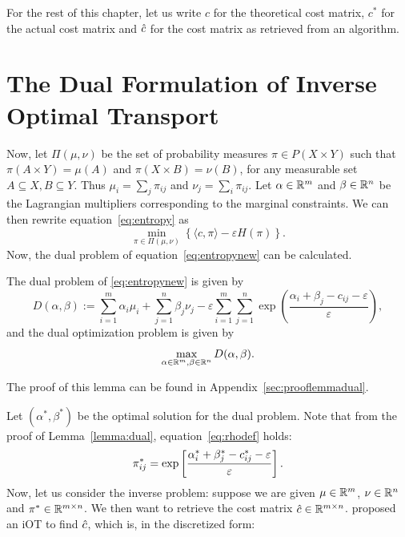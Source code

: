 For the rest of this chapter, let us write $c$ for the theoretical cost matrix, $c^*$ for the actual cost matrix and $\hat{c}$ for the cost matrix as retrieved from an algorithm.

\section{The Dual Formulation of Inverse Optimal Transport}
Now, let $\Pi(\mu, \nu)$ be the set of probability measures $\pi \in P(X \times Y)$ such that $\pi(A \times Y) = \mu(A)$ and $\pi(X \times B) = \nu(B)$, for any measurable set $A \subseteq X, B \subseteq Y$. Thus $\mu_i = \sum_j \pi_{ij}$ and $\nu_j = \sum_i \pi_{ij}$. Let $\alpha \in \mathbb{R}^m$ and $\beta \in \mathbb{R}^n$ be the Lagrangian multipliers corresponding to the marginal constraints. We can then rewrite equation~\eqref{eq:entropy} as 
\begin{equation}
	\min _{\pi \in \Pi(\mu, \nu)}\left\{\langle c, \pi\rangle-\varepsilon H(\pi)\right\}.
	\label{eq:entropynew}
\end{equation}
Now, the dual problem of equation~\eqref{eq:entropynew} can be calculated. 
\vspace{0.3cm}
\begin{lemma}
	The dual problem of \eqref{eq:entropynew} is given by 
	\begin{equation}
		D(\alpha, \beta) := \sum_{i=1}^m \alpha_i \mu_i + \sum_{j=1}^n \beta_j \nu_j - \varepsilon \sum_{i=1}^m \sum_{j=1}^n \exp\left(\frac{\alpha_i + \beta_j - c_{ij} - \varepsilon}{\varepsilon}\right),
		\label{eq:Dinproof}
	\end{equation}
	and the dual optimization problem is given by 
	\begin{equation}
		\max_{\alpha \in \mathbb{R}^m, \beta\in \mathbb{R}^n} D(\alpha, \beta).
		\label{eq:dual}
	\end{equation}
	\label{lemma:dual}
\end{lemma}
The proof of this lemma can be found in Appendix~\ref{sec:prooflemmadual}. \par 
Let $(\alpha^*, \beta^*)$ be the optimal solution for the dual problem. Note that from the proof of Lemma~\ref{lemma:dual}, equation~\eqref{eq:rhodef} holds:
\begin{equation}
	\pi_{ij}^* = \exp\left[\frac{\alpha_i^* + \beta_j^* - c^*_{ij} - \varepsilon}{\varepsilon}\right] .
	\label{eq:pi}
\end{equation}
Now, let us consider the inverse problem: suppose we are given $\mu \in \mathbb{R}^m$, $\nu \in \mathbb{R}^n$ and $\pi^* \in \mathbb{R}^{m \times n}$. We then want to retrieve the cost matrix $\hat{c} \in \mathbb{R}^{m \times n}$. \citep{ma2021} proposed an iOT to find $\hat{c}$, which is, in the discretized form:
